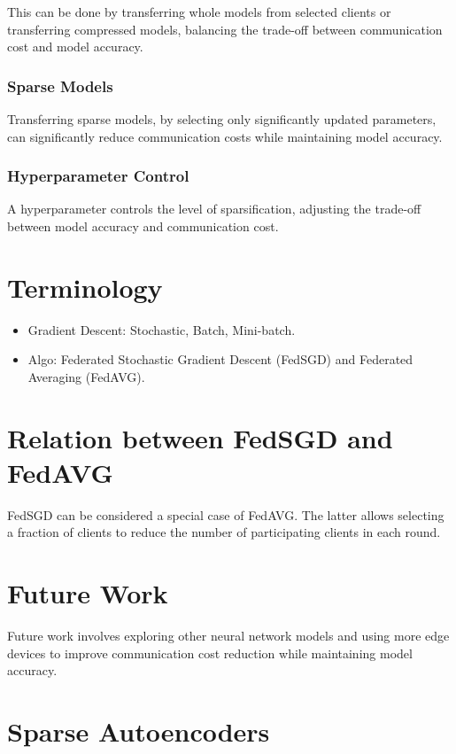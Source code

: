 \documentclass{article}
\begin{document}
This can be done by transferring whole models from selected clients or transferring compressed models, balancing the trade-off between communication cost and model accuracy.

\subsubsection{Sparse Models}

Transferring sparse models, by selecting only significantly updated parameters, can significantly reduce communication costs while maintaining model accuracy.

\subsubsection{Hyperparameter Control}

A hyperparameter controls the level of sparsification, adjusting the trade-off between model accuracy and communication cost.

\section{Terminology}

\begin{itemize}
\item Gradient Descent: Stochastic, Batch, Mini-batch.
\item Algo: Federated Stochastic Gradient Descent (FedSGD) and Federated Averaging (FedAVG).
\end{itemize}

\section{Relation between FedSGD and FedAVG}

FedSGD can be considered a special case of FedAVG. The latter allows selecting a fraction of clients to reduce the number of participating clients in each round.

\section{Future Work}

Future work involves exploring other neural network models and using more edge devices to improve communication cost reduction while maintaining model accuracy.

\section{Sparse Autoencoders}
\end{document}
